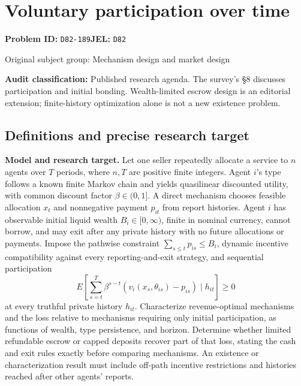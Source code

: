 \documentclass[11pt,a4paper]{article}
\begin{document}
\section*{Voluntary participation over time}
\textbf{Problem ID:} \texttt{D82-189}\quad \textbf{JEL:} \texttt{D82}\par
\label{problem:OP-0291}
{\sffamily\small\color{muted}Original subject group: Mechanism design and market design\par}
\label{definitions:problem:30007573}
\textbf{Audit classification:} Published research agenda. The survey’s §8 discusses participation and initial bonding. Wealth-limited escrow design is an editorial extension; finite-history optimization alone is not a new existence problem.
\subsection*{Definitions and precise research target}
\textbf{Model and research target.} Let one seller repeatedly allocate a service to \(n\) agents over \(T\) periods, where \(n,T\) are positive finite integers. Agent \(i\)'s type follows a known finite Markov chain and yields quasilinear discounted utility, with common discount factor \(\beta\in(0,1]\). A direct mechanism chooses feasible allocation \(x_t\) and nonnegative payment \(p_{it}\) from report histories. Agent \(i\) has observable initial liquid wealth \(B_i\in[0,\infty)\), finite in nominal currency, cannot borrow, and may exit after any private history with no future allocations or payments. Impose the pathwise constraint \(\sum_{s\leq t}p_{is}\leq B_i\), dynamic incentive compatibility against every reporting-and-exit strategy, and sequential participation
\[
 E\left[\sum_{s=t}^{T}\beta^{s-t}
 (v_i(x_s,\theta_{is})-p_{is})\mid h_{it}\right]\geq0
\]
at every truthful private history \(h_{it}\). Characterize revenue-optimal mechanisms and the loss relative to mechanisms requiring only initial participation, as functions of wealth, type persistence, and horizon. Determine whether limited refundable escrow or capped deposits recover part of that loss, stating the cash and exit rules exactly before comparing mechanisms. An existence or characterization result must include off-path incentive restrictions and histories reached after other agents' reports.
\end{document}

